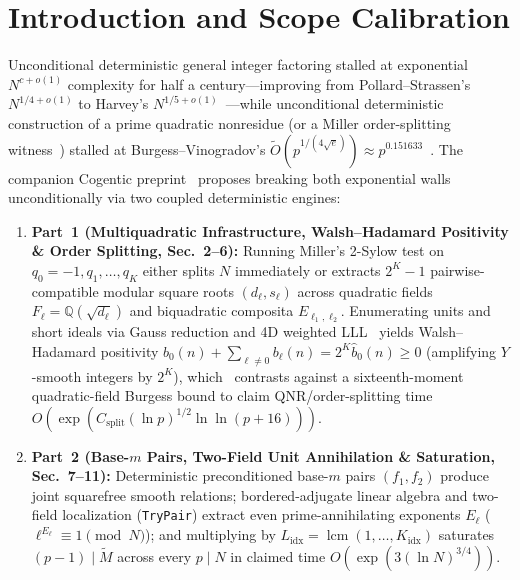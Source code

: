 \documentclass[10pt,twocolumn]{article}
\newcommand{\QQ}{\mathbb{Q}}
\begin{document}
\section{Introduction and Scope Calibration}\label{sec:intro}
Unconditional deterministic general integer factoring stalled at exponential $N^{c+o(1)}$ complexity for half a century—improving from Pollard--Strassen's $N^{1/4+o(1)}$ to Harvey's $N^{1/5+o(1)}$~\cite{harvey2021exponent}—while unconditional deterministic construction of a prime quadratic nonresidue (or a Miller order-splitting witness~\cite{miller1976riemann}) stalled at Burgess--Vinogradov's $\tilde{O}(p^{1/(4\sqrt{e})}) \approx p^{0.151633}$~\cite{burgess1963character}. The companion Cogentic preprint~\cite{cogentic2026detfactoring,cai2026cogentic} proposes breaking both exponential walls unconditionally via two coupled deterministic engines:
\begin{enumerate}[leftmargin=1.2em,itemsep=1pt,topsep=2pt]
  \item \textbf{Part~1 (Multiquadratic Infrastructure, Walsh--Hadamard Positivity \& Order Splitting, Sec.~2--6):} Running Miller's 2-Sylow test on $q_0=-1, q_1,\dots,q_K$ either splits $N$ immediately or extracts $2^K-1$ pairwise-compatible modular square roots $(d_\ell,s_\ell)$ across quadratic fields $F_\ell = \QQ(\sqrt{d_\ell})$ and biquadratic composita $E_{\ell_1,\ell_2}$. Enumerating units and short ideals via Gauss reduction and 4D weighted LLL~\cite{lenstra1982factoring} yields Walsh--Hadamard positivity $b_0(n)+\sum_{\ell\ne 0}b_\ell(n)=2^K\hat{b}_0(n)\ge 0$ (amplifying $Y$-smooth integers by $2^K$), which~\cite{cogentic2026detfactoring} contrasts against a sixteenth-moment quadratic-field Burgess bound to claim QNR/order-splitting time $O(\exp(C_{\mathrm{split}}(\ln p)^{1/2}\ln\ln(p+16)))$.
  \item \textbf{Part~2 (Base-$m$ Pairs, Two-Field Unit Annihilation \& Saturation, Sec.~7--11):} Deterministic preconditioned base-$m$ pairs $(f_1,f_2)$ produce joint squarefree smooth relations; bordered-adjugate linear algebra and two-field localization (\texttt{TryPair}) extract even prime-annihilating exponents $E_\ell$ ($\ell^{E_\ell}\equiv 1\pmod N$); and multiplying by $L_{\mathrm{idx}} = \operatorname{lcm}(1,\dots,K_{\mathrm{idx}})$ saturates $(p-1)\mid \tilde{M}$ across every $p\mid N$ in claimed time $O(\exp(3(\ln N)^{3/4}))$.
\end{enumerate}
\end{document}
